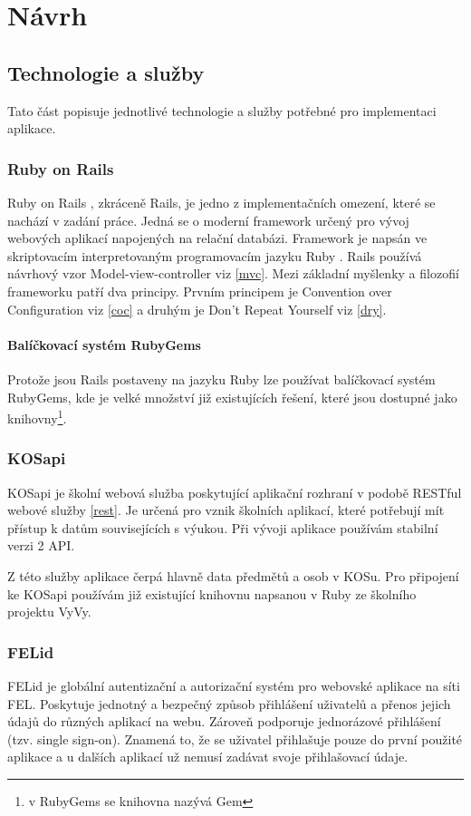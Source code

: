 \chapter{Návrh}

\section{Technologie a služby}
Tato část popisuje jednotlivé technologie a služby potřebné pro implementaci aplikace.

\subsection{Ruby on Rails}
Ruby on Rails \cite{rubyonrails}, zkráceně Rails, je jedno z implementačních omezení, které se nachází v zadání práce. Jedná se o moderní framework určený pro vývoj webových aplikací napojených na relační databázi. Framework je napsán ve skriptovacím interpretovaným programovacím jazyku Ruby \cite{ruby}. Rails používá návrhový vzor Model-view-controller viz \ref{mvc}. Mezi základní myšlenky a filozofií frameworku patří dva principy. Prvním principem je Convention over Configuration viz \ref{coc} a druhým je Don’t Repeat Yourself viz \ref{dry}.

\subsubsection{Balíčkovací systém RubyGems}
Protože jsou Rails postaveny na jazyku Ruby lze používat balíčkovací systém RubyGems, kde je velké množství již existujících řešení, které jsou dostupné jako knihovny\footnote{v RubyGems se knihovna nazývá Gem}. 

\subsection{KOSapi}
\label{kosapi}
KOSapi je školní webová služba poskytující aplikační rozhraní v podobě RESTful webové služby \ref{rest}. Je určená pro vznik školních aplikací, které potřebují mít přístup k datům souvisejících s výukou. Při vývoji aplikace používám stabilní verzi 2 API. 

Z této služby aplikace čerpá hlavně data předmětů a osob v KOSu. Pro připojení ke KOSapi používám již existující knihovnu napsanou v Ruby ze školního projektu VyVy\cite{vyvy_project}.  

\subsection{FELid}
\label{felid}
FELid \cite{felid} je globální autentizační a autorizační systém pro webovské aplikace na síti FEL. Poskytuje jednotný a bezpečný způsob přihlášení uživatelů a přenos jejich údajů do různých aplikací na webu. Zároveň podporuje jednorázové přihlášení (tzv. single sign-on). Znamená to, že se uživatel přihlašuje pouze do první použité aplikace a u dalších aplikací už nemusí zadávat svoje přihlašovací údaje.


